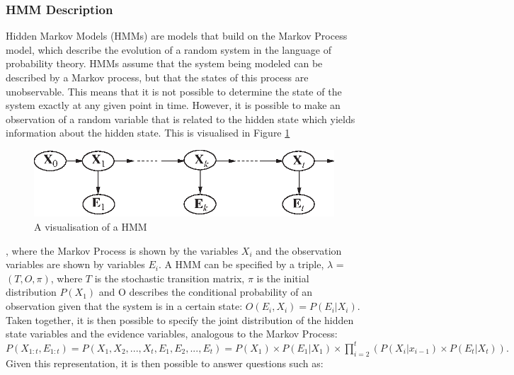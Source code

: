 \subsubsection{HMM Description}
Hidden Markov Models (HMMs) are models that build on the Markov Process model, which describe the evolution of a random system in the language of probability theory. HMMs assume that the system being modeled can be described by a Markov process, but that the states of this process are unobservable. This means that it is not possible to determine the state of the system exactly at any given point in time. However, it is possible to make an observation of a random variable that is related to the hidden state which yields information about the hidden state. This is visualised in Figure \ref{fig:hmm}
\begin{figure}[]
    \centering
    \includegraphics{Chapters/MultiAgentTargetDetection/BayesianFiltering/Figs/smoothing-dbn.eps}
    \caption{A visualisation of a HMM \cite{AIAMA}}
    \label{fig:hmm}
\end{figure}
, where the Markov Process is shown by the variables $X_i$ and the observation variables are shown by variables $E_i$. A HMM can be specified by a triple, $\lambda$ = $(T, O, \pi)$, where $T$ is the stochastic transition matrix, $\pi$ is the initial distribution $P(X_1)$ and O describes the conditional probability of an observation given that the system is in a certain state: $O(E_i, X_i) = P(E_{i} | X_{i})$. Taken together, it is then possible to specify the joint distribution of the hidden state variables and the evidence variables, analogous to the Markov Process: 
$
P(X_{1:t}, E_{1:t}) = P(X_1, X_2, ..., X_t, E_1, E_2, ..., E_t) = P(X_1) \times P(E_1 | X_1) \times
\prod_{i=2}^{t}{(P(X_i | x_{i-1}) \times P(E_t | X_t))}.
$Given this representation, it is then possible to answer questions such as:
